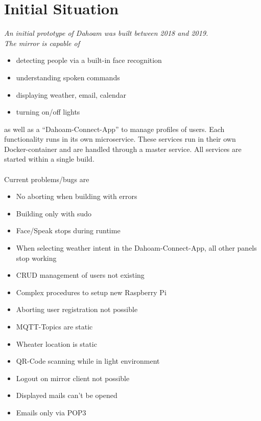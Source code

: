 \documentclass[12pt]{article}
\theoremstyle{definition}
\newenvironment{explanation}{%
   \setlength{\parindent}{0pt}
   \itshape
   \color{blue}
}{}
\begin{document}
\section{Initial Situation} 
\begin{explanation} \color{black} \normalfont
An initial prototype of Dahoam was built between 2018 and 2019. \\
 
The mirror is capable of
\begin{itemize}
	\item detecting people via a built-in face recognition
	\item understanding spoken commands
	\item displaying weather, email, calendar
	\item turning on/off lights
\end{itemize}


as well as a “Dahoam-Connect-App” to manage profiles of users. 
Each functionality runs in its own microservice. These services run in their own Docker-container and are handled through a master service. All services are started within a single build.\\ \\
Current problems/bugs are
\begin{itemize}
    \item No aborting when building with errors
    \item Building only with sudo
    \item Face/Speak stops during runtime
    \item When selecting weather intent in the Dahoam-Connect-App, all other panels stop working
    \item CRUD management of users not existing
    \item Complex procedures to setup new Raspberry Pi
    \item Aborting user registration not possible
    \item MQTT-Topics are static
    \item Wheater location is static
    \item QR-Code scanning while in light environment
    \item Logout on mirror client not possible
    \item Displayed mails can't be opened
    \item Emails only via POP3
\end{itemize}

\end{explanation}
\end{document}

